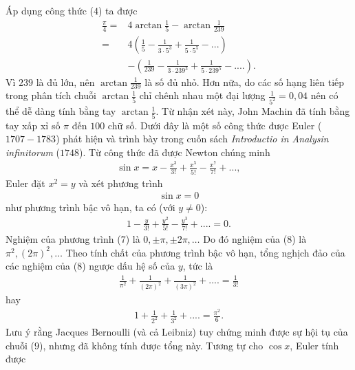 \begin{multicols}{2}
	Áp dụng công thức ($4$) ta được
	\begin{align*}
			\!\!\!\!\!\!\frac{\pi }{4} = &4\arctan \frac{1}{5} - \arctan \frac{1}{{239}} \\
			= &4\left( {\frac{1}{5} - \frac{1}{{3 \cdot {5^3}}} + \frac{1}{{5 \cdot {5^5}}} - ...} \right) \\
			&-\!\! \left(\!\! {\frac{1}{{239}} \!-\! \frac{1}{{3 \!\cdot\! {{239}^3}}} \!+\! \frac{1}{{5 \!\cdot\! {{239}^5}}} \!-\! ....}\!\! \right)\!\!. \tag{$6$}
	\end{align*}
	Vì $239$ là đủ lớn, nên $\arctan\frac{1}{239}$ là số đủ nhỏ. Hơn nữa, do các số hạng liên tiếp trong phân tích chuỗi $\arctan\frac{1}{5}$ chỉ chênh nhau một đại lượng $\frac{1}{5^2} = 0{,}04$ nên có thể dễ dàng tính bằng tay $\arctan \frac{1}{5}$. Từ nhận xét này, John Machin đã tính bằng tay xấp xỉ số $\pi$ đến $100$ chữ số. 
	\vskip 0.1cm
	Dưới đây là một số công thức được Euler ($1707-1783$) phát hiện và trình bày trong cuốn sách \textit{Introductio in Analysin infinitorum} ($1748$).
	\vskip 0.1cm
	Từ công thức đã được Newton chúng minh
	\begin{align*}
		\sin x = x - \frac{{{x^3}}}{{3!}} + \frac{{{x^5}}}{{5!}} - \frac{{{x^7}}}{{7!}} + ...,
	\end{align*}
	Euler đặt $x^2 = y$ và xét phương trình 
	\begin{align*}
		\sin x = 0 \tag{$7$}
	\end{align*}
	như phương trình bậc vô hạn, ta có (với $y \ne 0 $):
	\begin{align*}
		1 - \frac{y}{{3!}} + \frac{{{y^2}}}{{5!}} - \frac{{{y^3}}}{{7!}} + .... = 0. \tag{$8$}
	\end{align*}
	Nghiệm của phương trình ($7$) là $0, \pm \pi, \pm 2\pi, \ldots$  Do đó nghiệm của ($8$) là $\pi^2, (2\pi)^2, \ldots$
	\vskip 0.1cm  
	Theo tính chất của phương trình bậc vô hạn, tổng nghịch đảo của các nghiệm của ($8$) ngược dấu hệ số của $y$, tức là
	\begin{align*}
		\frac{1}{{{\pi ^2}}} + \frac{1}{{{{\left( {2\pi } \right)}^2}}} + \frac{1}{{{{\left( {3\pi } \right)}^2}}} + .... = \frac{1}{{3!}}
	\end{align*}
	hay 
	\begin{align*}
		1 + \frac{1}{{{2^2}}} + \frac{1}{{{3^2}}} + .... = \frac{{{\pi ^2}}}{6}. \tag{$9$}
	\end{align*}
	Lưu ý rằng Jacques Bernoulli (và cả Leibniz) tuy chứng minh được sự hội tụ của chuỗi ($9$), nhưng đã không tính được tổng này. 
	\vskip 0.1cm
	Tương tự cho $\cos x$,  Euler tính được

\end{multicols}
